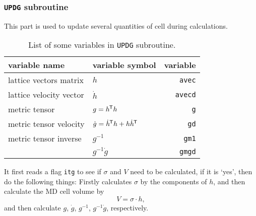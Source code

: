 
\subsubsection{\texttt{UPDG} subroutine}

This part is used to update several quantities of cell during calculations.

\begin{table}[htbp]
 \centering
 \caption{List of some variables in \texttt{UPDG} subroutine.}
 \begin{tabular}{@{}llr@{}}
  \toprule
  variable name           & variable symbol                                 & variable       \\
  \midrule
  lattice vectors matrix  & $h$                                             & \texttt{avec}  \\
  lattice velocity vector & $\dot{h}$                                       & \texttt{avecd} \\
  metric tensor           & $g = h ^{\mkern-1.5mu\mathsf{T}} h$                                 & \texttt{g}     \\
  metric tensor velocity  & $\dot{g} = \dot{ h }^{\mkern-1.5mu\mathsf{T}} h + h \dot{ h }^{\mkern-1.5mu\mathsf{T}}$ & \texttt{gd}    \\
  metric tensor inverse   & $g^{-1}$                                        & \texttt{gm1}   \\
                          & $g^{-1} \dot{g}$                                & \texttt{gmgd}  \\
  \bottomrule
 \end{tabular}%
 \label{tab:updg}%
\end{table}%


It first reads a flag \texttt{itg} to see if $\sigma$ and $V$ need to be calculated,
if it is `yes', then do the following things:
Firstly calculates $\sigma$ by the components of $h$, and then calculate the
MD cell volume by
\begin{equation}
 V = \sigma \cdot h,
\end{equation}
and then calculate $g$, $\dot{ g }$, $g^{-1}$, $g^{-1}\dot{g}$, respectively.
